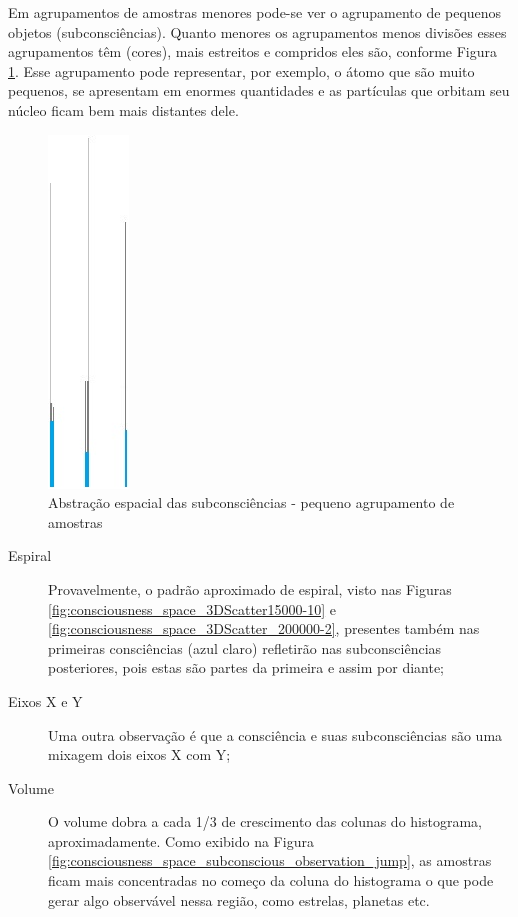 Em agrupamentos de amostras menores pode-se ver o agrupamento de pequenos objetos (subconsciências). Quanto menores os agrupamentos menos divisões esses agrupamentos têm (cores), mais estreitos e compridos eles são, conforme Figura \ref{fig:consciousness_space_subconsciousness_min}. Esse agrupamento pode representar, por exemplo, o átomo que são muito pequenos, se apresentam em enormes quantidades e as partículas que orbitam seu núcleo ficam bem mais distantes dele.
\begin{figure}[H]
\caption{Abstração espacial das subconsciências - pequeno agrupamento de amostras}
\label{fig:consciousness_space_subconsciousness_min}
\centering
\includegraphics[scale=.9]{sections/images/consciousness_space_subconsciousness_min.jpg}
\end{figure}

\begin{description}
   \item[Espiral] Provavelmente, o padrão aproximado de espiral, visto nas Figuras \ref{fig:consciousness_space_3DScatter15000-10} e \ref{fig:consciousness_space_3DScatter_200000-2}, presentes também nas primeiras consciências (azul claro) refletirão nas subconsciências posteriores, pois estas são partes da primeira e assim por diante;
   \item[Eixos X e Y] Uma outra observação é que a consciência e suas subconsciências são uma mixagem dois eixos X com Y;
   \item[Volume] O volume dobra a cada 1/3 de crescimento das colunas do histograma, aproximadamente. Como exibido na Figura \ref{fig:consciousness_space_subconscious_observation_jump}, as amostras ficam mais concentradas no começo da coluna do histograma o que pode gerar algo observável nessa região, como estrelas, planetas etc.
\end{description}

